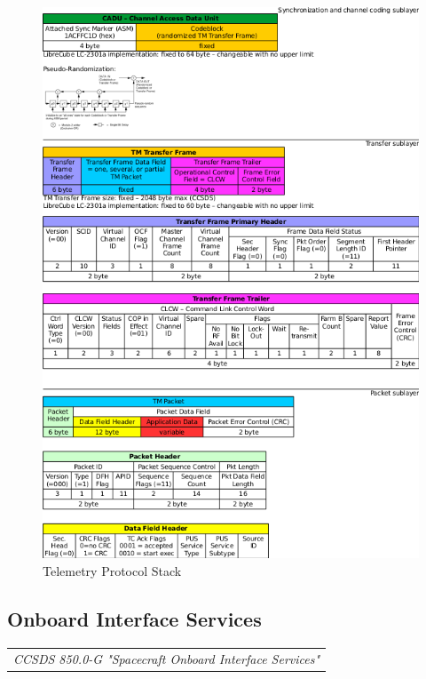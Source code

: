 \begin{figure}[h]
\centering\includegraphics[scale=0.7]{fig/telemetry_protocol_stack}
\caption{Telemetry Protocol Stack}
\label{fig:Telemetry Protocol Stack}
\end{figure}

\clearpage
\subsection{Onboard Interface Services}

\begin{tabular}{l}
\textit{CCSDS 850.0-G "Spacecraft Onboard Interface Services" \cite{CCSDS 850.0-G}} 
\end{tabular}


